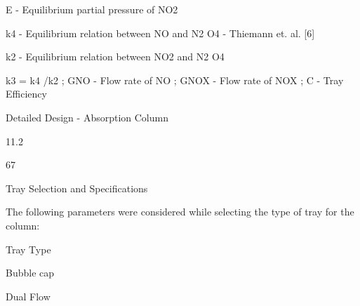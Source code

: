 \documentclass[a4paper,portrait,12pt]{article}
\begin{document}
\begin{flushleft}
E - Equilibrium partial pressure of NO2
\end{flushleft}


\begin{flushleft}
k4 - Equilibrium relation between NO and N2 O4 - Thiemann et. al. [6]
\end{flushleft}


\begin{flushleft}
k2 - Equilibrium relation between NO2 and N2 O4
\end{flushleft}


\begin{flushleft}
k3 = k4 /k2 ; GNO - Flow rate of NO ; GNOX - Flow rate of NOX ; C - Tray Efficiency
\end{flushleft}





\begin{flushleft}
\newpage
Detailed Design - Absorption Column
\end{flushleft}





11.2





67





\begin{flushleft}
Tray Selection and Specifications
\end{flushleft}





\begin{flushleft}
The following parameters were considered while selecting the type of tray for the column:
\end{flushleft}


\begin{flushleft}
Tray Type
\end{flushleft}





\begin{flushleft}
Bubble cap
\end{flushleft}





\begin{flushleft}
Dual Flow
\end{flushleft}
\end{document}
